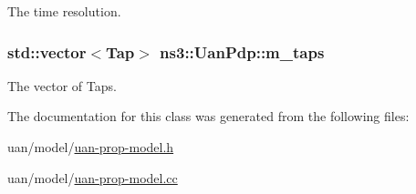 The time resolution. 

\subsubsection[{\texorpdfstring{m\+\_\+taps}{m_taps}}]{\setlength{\rightskip}{0pt plus 5cm}std\+::vector$<${\bf Tap}$>$ ns3\+::\+Uan\+Pdp\+::m\+\_\+taps\hspace{0.3cm}{\ttfamily [private]}}\hypertarget{classns3_1_1UanPdp_a4b340fa551ee269c44dabe6ffb4546fb}{}\label{classns3_1_1UanPdp_a4b340fa551ee269c44dabe6ffb4546fb}


The vector of Taps. 



The documentation for this class was generated from the following files\+:\begin{DoxyCompactItemize}
\item 
uan/model/\hyperlink{uan-prop-model_8h}{uan-\/prop-\/model.\+h}\item 
uan/model/\hyperlink{uan-prop-model_8cc}{uan-\/prop-\/model.\+cc}\end{DoxyCompactItemize}
